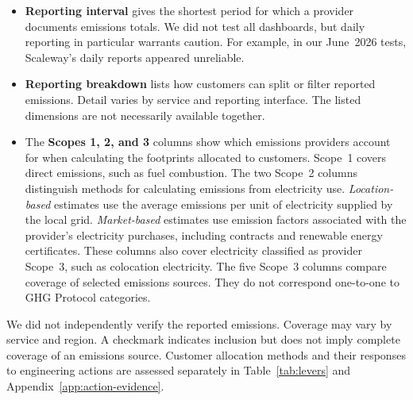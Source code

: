 \begin{itemize}
\item \textbf{Reporting interval} gives the shortest period for which a provider documents emissions totals. We did not test all dashboards, but daily reporting in particular warrants caution. For example, in our June~2026 tests, Scaleway's daily reports appeared unreliable.
\item \textbf{Reporting breakdown} lists how customers can split or filter reported emissions. Detail varies by service and reporting interface. The listed dimensions are not necessarily available together.
\item The \textbf{Scopes 1, 2, and 3} columns show which emissions providers account for when calculating the footprints allocated to customers. Scope~1 covers direct emissions, such as fuel combustion. The two Scope~2 columns distinguish methods for calculating emissions from electricity use. \emph{Location-based} estimates use the average emissions per unit of electricity supplied by the local grid. \emph{Market-based} estimates use emission factors associated with the provider's electricity purchases, including contracts and renewable energy certificates. These columns also cover electricity classified as provider Scope~3, such as colocation electricity. The five Scope~3 columns compare coverage of selected emissions sources. They do not correspond one-to-one to GHG Protocol categories.
\end{itemize}

We did not independently verify the reported emissions.
Coverage may vary by service and region.
A checkmark indicates inclusion but does not imply complete coverage of an emissions source.
Customer allocation methods and their responses to engineering actions are assessed separately in Table~\ref{tab:levers} and Appendix~\ref{app:action-evidence}.

